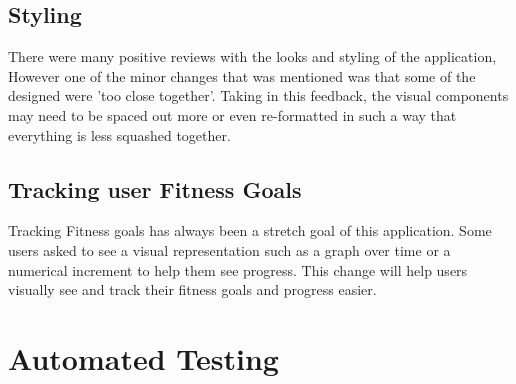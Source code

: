 \documentclass[12pt, titlepage]{article}
\begin{document}
\subsection{Styling}
There were many positive reviews with the looks and styling of the application, However one of the minor changes that was mentioned was that some of the designed were 'too close together'. Taking in this feedback, the visual components may need to be spaced out more or even re-formatted in such a way that everything is less squashed together.
\subsection{Tracking user Fitness Goals}
Tracking Fitness goals  has always been a stretch goal of this application. Some users asked to see a visual representation such as a graph over time or a numerical increment to help them see progress. This change will help users visually see and track their fitness goals and progress easier.

\section{Automated Testing}
		
\end{document}
